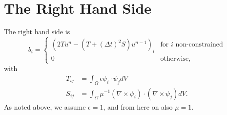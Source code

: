 \documentclass{scrartcl}
\begin{document}
\section{The Right Hand Side}

The right hand side is
\begin{equation}
  b_i=\begin{cases}
    (2Tu^n-(T+(\Delta t)^2S)u^{n-1})_i&\text{for $i$ non-constrained} \\
    0                                &\text{otherwise},
  \end{cases}
\end{equation}
with
\begin{align}
  T_{ij}&=\int_\Omega\epsilon\psi_i\cdot\psi_jdV \\
  S_{ij}&=\int_\Omega\mu^{-1}(\nabla\times\psi_i)\cdot(\nabla\times\psi_j)dV.
\end{align}
As noted above, we assume $\epsilon=1$, and from here on also $\mu=1$.
\end{document}
